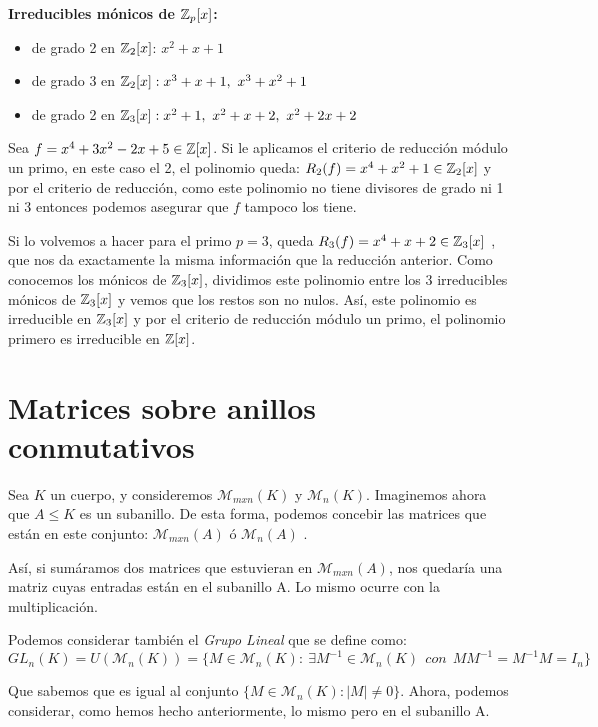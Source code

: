 \textbf{Irreducibles mónicos de $\mathbb{Z}_p[x]$:}
\begin{itemize}
	\item de grado 2 en $\mathbb{Z}_2[x]$: $x^2+x+1$
	\item de grado 3 en $\ent_2[x]: x^3+x+1,\ x^3+x^2+1$
	\item de grado 2 en $\ent_3[x]: x^2+1,\ x^2+x+2,\ x^2+2x+2$
\end{itemize}
\begin{ejemplo}
	Sea $f = x^4 +3x^2 -2x +5 \in \mathbb{Z}[x]$. Si le aplicamos el criterio de reducción módulo un primo, en este caso el 2, el polinomio queda: $R_2(f) = x^4 + x^2 +1 \in \mathbb{Z}_2[x]$ y por el criterio de reducción, como este polinomio no tiene divisores de grado ni 1 ni 3 entonces podemos asegurar que $f$ tampoco los tiene.

	Si lo volvemos a hacer para el primo $p=3$, queda $R_3(f) = x^4 + x + 2 \in \mathbb{Z}_3[x]$ , que nos da exactamente la misma información que la reducción anterior. Como conocemos los mónicos de $\mathbb{Z}_3[x]$, dividimos este polinomio entre los 3 irreducibles mónicos de $\mathbb{Z}_3[x]$ y vemos que los restos son no nulos. Así, este polinomio es irreducible en $\mathbb{Z}_3[x]$ y por el criterio de reducción módulo un primo, el polinomio primero es irreducible en $\mathbb{Z}[x]$.
\end{ejemplo}



\section{Matrices sobre anillos conmutativos}
Sea $K$ un cuerpo, y consideremos $\mathcal{M}_{mxn}(K)$ y  $\mathcal{M}_{n}(K)$. Imaginemos ahora que $A\leq K$ es un subanillo. De esta forma, podemos concebir las matrices que están en este conjunto: $\mathcal{M}_{mxn}(A)$ ó  $\mathcal{M}_{n}(A)$ .

Así, si sumáramos dos matrices que estuvieran en  $\mathcal{M}_{mxn}(A)$, nos quedaría una matriz cuyas entradas están en el subanillo A. Lo mismo ocurre con la multiplicación.


Podemos considerar también el \emph{Grupo Lineal} que se define como:
\[
GL_n(K) = U (\mathcal{M}_n(K)) = \{ M \in \mathcal{M}_n(K) :  \ \exists M^{-1} \in \mathcal{M}_n(K) \ \ con \ \ MM^{-1} = M^{-1}M = I_n\}
\]

Que sabemos que es igual al conjunto $\{M \in \mathcal{M}_n(K) : | M | \ne 0\}$. Ahora, podemos considerar, como hemos hecho anteriormente, lo mismo pero en el subanillo A.

